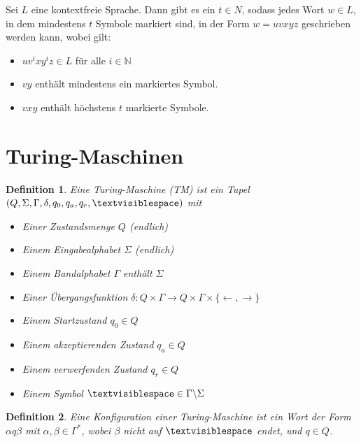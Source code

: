 \documentclass{cheat-sheet}
\newtheorem*{definition}{Definition}
\begin{document}

\begin{satz}
Sei $L$ eine kontextfreie Sprache. Dann gibt es ein $t \in N$, sodass jedes Wort $w \in L$, in dem mindestens $t$ Symbole markiert sind, in der Form $w = uvxyz$ geschrieben werden kann, wobei gilt:

\begin{itemize}
  \item $uv^{i}xy^{i}z \in L$ für alle $i \in \mathbb{N}$
  \item $vy$ enthält mindestens ein markiertes Symbol.
  \item $vxy$ enthält höchstens $t$ markierte Symbole.
\end{itemize}
\end{satz}



\section{Turing-Maschinen}

\begin{definition}
Eine \emph{Turing-Maschine} (TM) ist ein Tupel $(Q, \Sigma, \Gamma, \delta, q_{0}, q_{a}, q_{r}, \textvisiblespace)$ mit

\begin{itemize}{\leftmargin=0em}
  \setlength{\leftmargin}{0pt}
  \item Einer Zustandsmenge $Q$ (endlich)
  \item Einem Eingabealphabet $\Sigma$ (endlich)
  \item Einem \emph{Bandalphabet} $\Gamma$ enthält $\Sigma$
  \item Einer Übergangsfunktion $\delta : Q \times \Gamma \to Q \times \Gamma \times \{ \leftarrow, \rightarrow \} $
  \item Einem Startzustand $q_{0} \in Q$
  \item Einem \emph{akzeptierenden Zustand} $q_{a} \in Q$
  \item Einem \emph{verwerfenden Zustand} $q_{r} \in Q$
  \item Einem Symbol $\textvisiblespace \in \Gamma \backslash \Sigma$
\end{itemize}
\end{definition}

\begin{definition}
Eine \emph{Konfiguration} einer Turing-Maschine ist ein Wort der Form $\alpha q \beta$ mit $\alpha, \beta \in \Gamma^{*}$, wobei $\beta$ nicht auf $\textvisiblespace$ endet, und $q \in Q$.
\end{definition}
\end{document}
